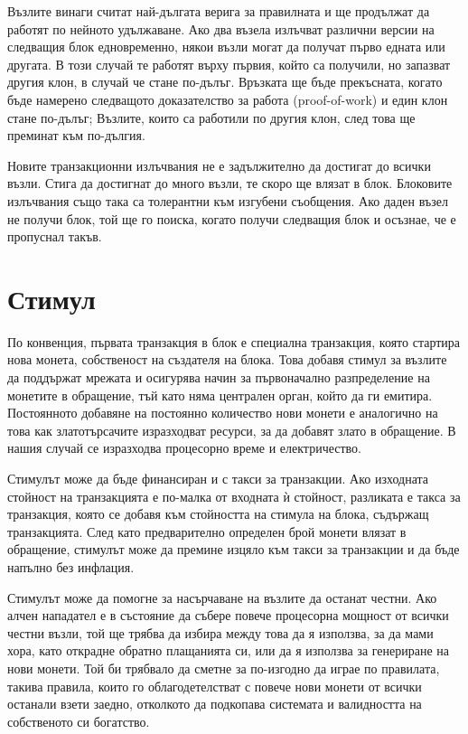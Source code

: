 \documentclass[11pt,a4paper]{article}
\begin{document}
Възлите винаги считат най-дългата верига за правилната и ще продължат да работят по нейното удължаване. Ако два възела излъчват различни версии на следващия блок едновременно, някои възли могат да получат първо едната или другата. В този случай те работят върху първия, който са получили, но запазват другия клон, в случай че стане по-дълъг. Връзката ще бъде прекъсната, когато бъде намерено следващото доказателство за работа (proof-of-work) и един клон стане по-дълъг; Възлите, които са работили по другия клон, след това ще преминат към по-дългия.

Новите транзакционни излъчвания не е задължително да достигат до всички възли. Стига да достигнат до много възли, те скоро ще влязат в блок. Блоковите излъчвания също така са толерантни към изгубени съобщения. Ако даден възел не получи блок, той ще го поиска, когато получи следващия блок и осъзнае, че е пропуснал такъв.

\section{Стимул}
По конвенция, първата транзакция в блок е специална транзакция, която стартира нова монета, собственост на създателя на блока. Това добавя стимул за възлите да поддържат мрежата и осигурява начин за първоначално разпределение на монетите в обращение, тъй като няма централен орган, който да ги емитира. Постоянното добавяне на постоянно количество нови монети е аналогично на това как златотърсачите изразходват ресурси, за да добавят злато в обращение. В нашия случай се изразходва процесорно време и електричество.

Стимулът може да бъде финансиран и с такси за транзакции. Ако изходната стойност на транзакцията е по-малка от входната ѝ стойност, разликата е такса за транзакция, която се добавя към стойността на стимула на блока, съдържащ транзакцията. След като предварително определен брой монети влязат в обращение, стимулът може да премине изцяло към такси за транзакции и да бъде напълно без инфлация.

Стимулът може да помогне за насърчаване на възлите да останат честни. Ако алчен нападател е в състояние да събере повече процесорна мощност от всички честни възли, той ще трябва да избира между това да я използва, за да мами хора, като открадне обратно плащанията си, или да я използва за генериране на нови монети. Той би трябвало да сметне за по-изгодно да играе по правилата, такива правила, които го облагодетелстват с повече нови монети от всички останали взети заедно, отколкото да подкопава системата и валидността на собственото си богатство.
\end{document}
